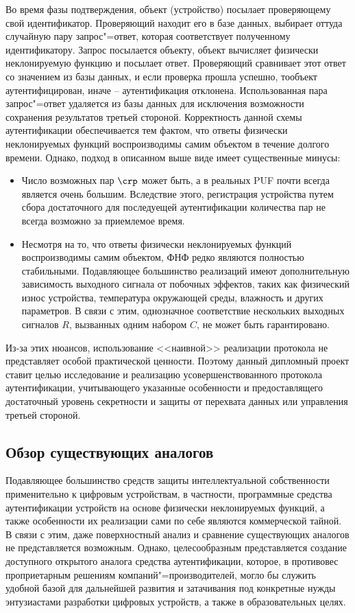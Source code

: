 \begin{enumerate}
Во время фазы подтверждения, объект (устройство) посылает проверяющему свой идентификатор. Проверяющий находит его в базе данных, выбирает оттуда случайную пару запрос"=ответ, которая соответствует полученному идентификатору. Запрос посылается объекту, объект вычисляет физически неклонируемую функцию и посылает ответ. Проверяющий сравнивает этот ответ со значением из базы данных, и если проверка прошла успешно, тообъект аутентифицирован, иначе -- аутентификация отклонена. Использованная пара запрос"=ответ удаляется из базы данных для исключения возможности сохранения результатов третьей стороной. Корректность данной схемы аутентификации обеспечивается тем фактом, что ответы физически неклонируемых функций воспроизводимы самим объектом в течение долгого времени.
Однако, подход в описанном выше виде имеет существенные минусы:
\begin{itemize}
  \item Число возможных пар $ \crp $ может быть, а в реальных PUF почти всегда является очень большим. Вследствие этого, регистрация устройства путем сбора достаточного для последуещей аутентификации количества пар не всегда возможно за приемлемое время.
  \item Несмотря на то, что ответы физически неклонируемых функций воспроизводимы самим объектом, ФНФ редко являются полностью стабильными. Подавляющее большинство реализаций имеют дополнительную зависимость выходного сигнала от побочных эффектов, таких как физический износ устройства, температура окружающей среды, влажность и других параметров. В связи с этим, однозначное соответствие нескольких выходных сигналов $ R $, вызванных одним набором $ C $, не может быть гарантировано.
\end{itemize}

Из-за этих нюансов, использование <<наивной>> реализации протокола не представляет особой практической ценности. Поэтому данный дипломный проект ставит целью исследование и реализацию усовершенствованного протокола аутентификации, учитывающего указанные особенности и предоставлящего достаточный уровень секретности и защиты от перехвата данных или управления третьей стороной.


\subsection{Обзор существующих аналогов}
Подавляющее большинство средств защиты интеллектуальной собственности применительно к цифровым устройствам, в частности, программные средства аутентификации устройств на основе физически неклонируемых функций, а также особенности их реализации сами по себе являются коммерческой тайной. В связи с этим, даже поверхностный анализ и сравнение существующих аналогов не представляется возможным. Однако, целесообразным представляется создание доступного открытого аналога средства аутентификации, которое, в противовес проприетарным решениям компаний"=производителей, могло бы служить удобной базой для дальнейшей развития и затачивания под конкретные нужды энтузиастами разработки цифровых устройств, а также в образовательных целях.



\end{enumerate}
